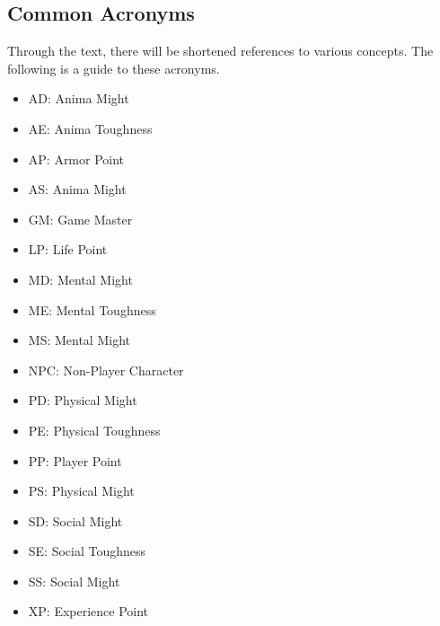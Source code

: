 \begin{multicols}{2}
\section{Common Acronyms}

Through the text, there will be shortened references to various concepts.
The following is a guide to these acronyms.

\begin{itemize}
  \item AD: Anima Might
  \item AE: Anima Toughness
  \item AP: Armor Point
  \item AS: Anima Might
  \item GM: Game Master
  \item LP: Life Point
  \item MD: Mental Might
  \item ME: Mental Toughness
  \item MS: Mental Might
  \item NPC: Non-Player Character
  \item PD: Physical Might
  \item PE: Physical Toughness
  \item PP: Player Point
  \item PS: Physical Might
  \item SD: Social Might
  \item SE: Social Toughness
  \item SS: Social Might
  \item XP: Experience Point
\end{itemize}

\end{multicols}
